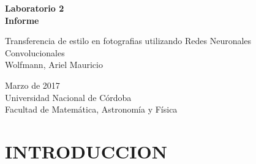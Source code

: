 \documentclass[a4paper,10pt]{article}
\begin{document}



\begin{titlepage}
  \begin{center}
  \vspace*{1in}
    \begin{Huge}
    \textbf{Laboratorio 2}\\
    \textbf{Informe} \\
    \end{Huge}
  \end{center}
  \begin{center}
    \begin{large}
      \vspace*{1in}
      Transferencia de estilo en fotografias utilizando Redes Neuronales Convolucionales \\
      Wolfmann, Ariel Mauricio\\
    \end{large}
    \vspace*{0.15in}
     Marzo de 2017\\
    \vspace*{0.15in}
    Universidad Nacional de Córdoba\\
    \vspace*{0.15in}
    Facultad de Matemática, Astronomía y Física\\
    \vspace*{0.6in}
  \end{center}
\end{titlepage}

\pagebreak

\section{INTRODUCCION}
\end{document}
